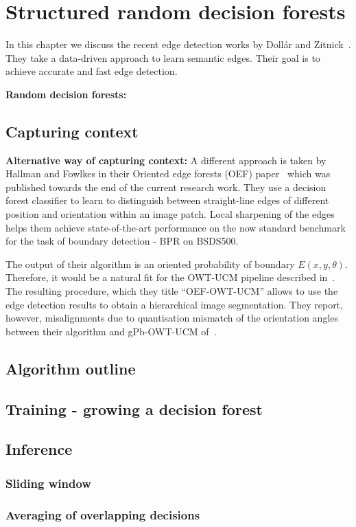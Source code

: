 \chapter{Structured random decision forests}
\label{Chapter3}
In this chapter we discuss the recent edge detection works by Doll\'ar and Zitnick~\cite{DollarICCV13edges,Dollar2014fast}. They take a data-driven approach to learn semantic edges. %
Their goal is to achieve accurate and fast edge detection. %

\textbf{Random decision forests:}

\section{Capturing context}
\textbf{Alternative way of capturing context:} A different approach is taken by Hallman and Fowlkes in their Oriented edge forests (OEF) paper~\cite{Hallman2014} which was published towards the end of the current research work. They use a decision forest classifier to learn to distinguish between straight-line edges of different position and orientation within an image patch. Local sharpening of the edges helps them achieve state-of-the-art performance on the now standard benchmark for the task of boundary detection - BPR on BSDS500.

The output of their algorithm is an oriented probability of boundary $E(x,y,\theta)$. Therefore, it would be a natural fit for the OWT-UCM pipeline described in~\cite{Arbelaez11}. The resulting procedure, which they title ``OEF-OWT-UCM'' allows to use the edge detection results to obtain a hierarchical image segmentation. They report, however, misalignments due to quantisation mismatch of the orientation angles between their algorithm and gPb-OWT-UCM of~\cite{Arbelaez11}.

\section{Algorithm outline}
\section{Training - growing a decision forest}
\section{Inference}
\subsection{Sliding window}
\subsection{Averaging of overlapping decisions}
